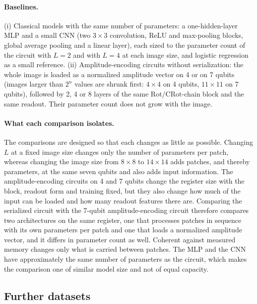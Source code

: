 \documentclass[11pt]{article}
\begin{document}
\paragraph{Baselines.}
(i) Classical models with the same number of parameters: a one-hidden-layer MLP and a small CNN (two $3\times3$ convolution, ReLU and max-pooling blocks, global average pooling and a linear layer), each sized to the parameter count of the circuit with $L=2$ and with $L=4$ at each image size, and logistic regression as a small reference. (ii) Amplitude-encoding circuits without serialization: the whole image is loaded as a normalized amplitude vector on 4 or on 7 qubits (images larger than $2^n$ values are shrunk first: $4\times4$ on 4 qubits, $11\times11$ on 7 qubits), followed by 2, 4 or 8 layers of the same $\mathrm{Rot}$/$\mathrm{CRot}$-chain block and the same readout. Their parameter count does not grow with the image.

\paragraph{What each comparison isolates.}
The comparisons are designed so that each changes as little as possible. Changing $L$ at a fixed image size changes only the number of parameters per patch, whereas changing the image size from $8\times8$ to $14\times14$ adds patches, and thereby parameters, at the same seven qubits and also adds input information. The amplitude-encoding circuits on 4 and 7 qubits change the register size with the block, readout form and training fixed, but they also change how much of the input can be loaded and how many readout features there are. Comparing the serialized circuit with the 7-qubit amplitude-encoding circuit therefore compares two architectures on the same register, one that processes patches in sequence with its own parameters per patch and one that loads a normalized amplitude vector, and it differs in parameter count as well. Coherent against measured memory changes only what is carried between patches. The MLP and the CNN have approximately the same number of parameters as the circuit, which makes the comparison one of similar model size and not of equal capacity.

\subsection{Further datasets}
\label{sec:meth-datasets}
\end{document}
